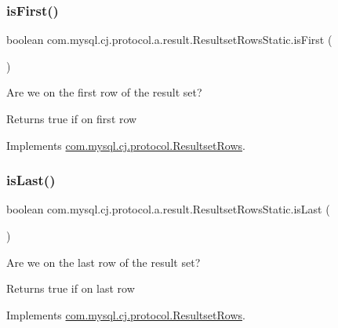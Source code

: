 \subsubsection{\texorpdfstring{is\+First()}{isFirst()}}
{\footnotesize\ttfamily boolean com.\+mysql.\+cj.\+protocol.\+a.\+result.\+Resultset\+Rows\+Static.\+is\+First (\begin{DoxyParamCaption}{ }\end{DoxyParamCaption})}

Are we on the first row of the result set?

\begin{DoxyReturn}{Returns}
true if on first row 
\end{DoxyReturn}


Implements \mbox{\hyperlink{interfacecom_1_1mysql_1_1cj_1_1protocol_1_1_resultset_rows_ae7d5b7ca8787eaca7ee5e0ca69ac2818}{com.\+mysql.\+cj.\+protocol.\+Resultset\+Rows}}.

\mbox{\label{classcom_1_1mysql_1_1cj_1_1protocol_1_1a_1_1result_1_1_resultset_rows_static_a2714d5e0fe10d3cb3b148a3fb2d6fec4}} 
\subsubsection{\texorpdfstring{is\+Last()}{isLast()}}
{\footnotesize\ttfamily boolean com.\+mysql.\+cj.\+protocol.\+a.\+result.\+Resultset\+Rows\+Static.\+is\+Last (\begin{DoxyParamCaption}{ }\end{DoxyParamCaption})}

Are we on the last row of the result set?

\begin{DoxyReturn}{Returns}
true if on last row 
\end{DoxyReturn}


Implements \mbox{\hyperlink{interfacecom_1_1mysql_1_1cj_1_1protocol_1_1_resultset_rows_ae52ab20020adafaf87c2f45bae82980d}{com.\+mysql.\+cj.\+protocol.\+Resultset\+Rows}}.

\mbox{\label{classcom_1_1mysql_1_1cj_1_1protocol_1_1a_1_1result_1_1_resultset_rows_static_ac6527b7e8cbc7cb3ec0c67c854f145b7}} 
